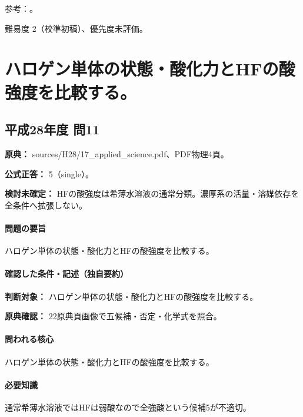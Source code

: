 \par 参考：\cite{inorganic_halogen_ref,inorganic_hydrogen_ref}。

\par 難易度 2（校準初稿）、優先度未評価。

\section{ハロゲン単体の状態・酸化力とHFの酸強度を比較する。}

\subsection{平成28年度 問11}
\label{q:h28-reg-applied-11}

\noindent\textbf{原典：} sources/H28/17\_applied\_science.pdf、PDF物理4頁。

\textbf{公式正答：} 5（single）。

\par\textbf{検討未確定：} HFの酸強度は希薄水溶液の通常分類。濃厚系の活量・溶媒依存を全条件へ拡張しない。

\paragraph{問題の要旨} ハロゲン単体の状態・酸化力とHFの酸強度を比較する。

\paragraph{確認した条件・記述（独自要約）}\mbox{}\par

\noindent\textbf{判断対象：} ハロゲン単体の状態・酸化力とHFの酸強度を比較する。\par

\noindent\textbf{原典確認：} 22原典頁画像で五候補・否定・化学式を照合。\par

\paragraph{問われる核心} ハロゲン単体の状態・酸化力とHFの酸強度を比較する。

\paragraph{必要知識} 通常希薄水溶液ではHFは弱酸なので全強酸という候補5が不適切。


